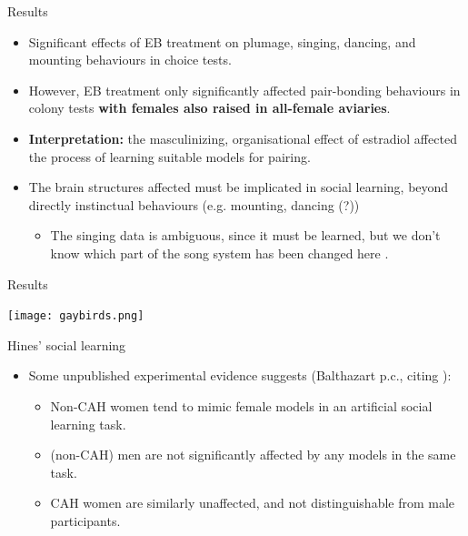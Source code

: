 \documentclass[hyperref={pdfpagelabels=false}]{beamer}
\begin{document}
\begin{frame}{\citet{mansukhanietal1996}}
\begin{block}{Results}
\begin{itemize}
	\item Significant effects of EB treatment on plumage, singing, dancing, and mounting behaviours in choice tests.
	\item However, EB treatment only significantly affected pair-bonding behaviours in colony tests \textbf{with females also raised in all-female aviaries}.
	\item \textbf{Interpretation:} the masculinizing, organisational effect of estradiol affected the process of learning suitable models for pairing.
	\item The brain structures affected must be implicated in social learning, beyond directly instinctual behaviours (e.g. mounting, dancing (?))
		\begin{itemize}
			\item The singing data is ambiguous, since it must be learned, but we don't know which part of the song system has been changed here \citep[see][]{balthazartetal2009}.
		\end{itemize}
	\end{itemize}
\end{block}
\end{frame}

\begin{frame}{\citet{mansukhanietal1996}}
\begin{block}{Results}
\begin{center}
	\texttt{[image: gaybirds.png]}
	\end{center}
\end{block}
\end{frame}


\begin{frame}{Hines' social learning}
\begin{itemize}
	\item Some unpublished experimental evidence suggests (Balthazart p.c., citing \citealt{hines2012}):
		\begin{itemize}
			\item Non-CAH women tend to mimic female models in an artificial social learning task.
			\item (non-CAH) men are not significantly affected by any models in the same task.
			\item CAH women are similarly unaffected, and not distinguishable from male participants.
		\end{itemize}
\end{itemize}

\end{frame}
\end{document}
